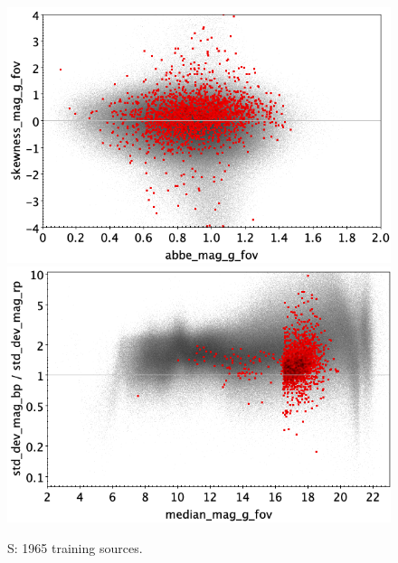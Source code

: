\documentclass[longauth]{aa}
\begin{document}
\begin{appendix}
\begin{figure}
\vspace{4mm}
 \includegraphics[width=0.45\hsize]{figures/appendix/S_trn_ask.png}  %
\hspace{2mm}
 \includegraphics[width=0.45\hsize]{figures/appendix/S_trn_msdr.png}  \\ %
\vspace{4mm}
 \caption{S: 1965 training sources.}  
 \label{fig:app:S_trn}
\end{figure}


\end{appendix}
\end{document}
